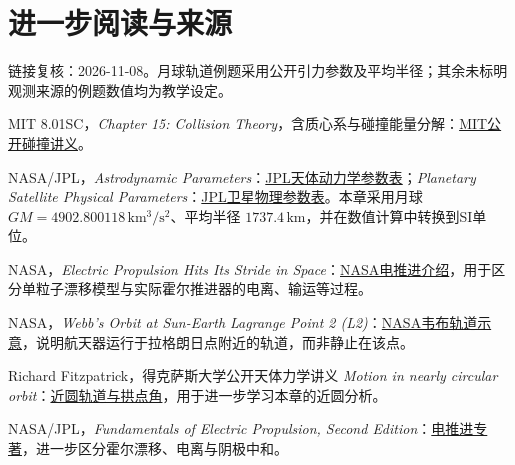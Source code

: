 \section*{进一步阅读与来源}
链接复核：2026-11-08。月球轨道例题采用公开引力参数及平均半径；其余未标明观测来源的例题数值均为教学设定。
\begin{bookreading}
\item MIT 8.01SC，\textit{Chapter 15: Collision Theory}，含质心系与碰撞能量分解：\href{https://ocw.mit.edu/courses/8-01sc-classical-mechanics-fall-2016/mit8_01scs22_chapter15.pdf}{MIT公开碰撞讲义}。
\item NASA/JPL，\textit{Astrodynamic Parameters}：\href{https://ssd.jpl.nasa.gov/astro_par.html}{JPL天体动力学参数表}；\textit{Planetary Satellite Physical Parameters}：\href{https://ssd.jpl.nasa.gov/sats/phys_par/sep.html}{JPL卫星物理参数表}。本章采用月球 $GM=4902.800118\,\mathrm{km^3/s^2}$、平均半径 $1737.4\,\mathrm{km}$，并在数值计算中转换到SI单位。
\item NASA，\textit{Electric Propulsion Hits Its Stride in Space}：\href{https://www.nasa.gov/organizations/osi/electric-propulsion-hits-its-stride-in-space/}{NASA电推进介绍}，用于区分单粒子漂移模型与实际霍尔推进器的电离、输运等过程。
\item NASA，\textit{Webb's Orbit at Sun-Earth Lagrange Point 2 (L2)}：\href{https://science.nasa.gov/asset/webb/webbs-orbit-at-sun-earth-lagrange-point-2-l2/}{NASA韦布轨道示意}，说明航天器运行于拉格朗日点附近的轨道，而非静止在该点。
\item Richard Fitzpatrick，得克萨斯大学公开天体力学讲义 \textit{Motion in nearly circular orbit}：\href{https://farside.ph.utexas.edu/teaching/celestial/Celestial/node43.html}{近圆轨道与拱点角}，用于进一步学习本章的近圆分析。
\item NASA/JPL，\textit{Fundamentals of Electric Propulsion, Second Edition}：\href{https://descanso.jpl.nasa.gov/SciTechBook/SciTechBook.html}{电推进专著}，进一步区分霍尔漂移、电离与阴极中和。
\end{bookreading}
